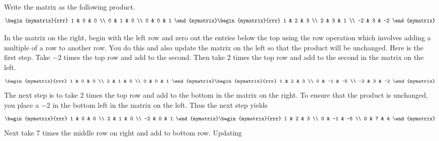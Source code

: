 \begin{solution}

Write the matrix as the following product.
\begin{equation*}
\begin{mymatrix}{rrr}
1 & 0 & 0 \\ 
0 & 1 & 0 \\ 
0 & 0 & 1
\end{mymatrix} \begin{mymatrix}{rrr}
1 & 2 & 3 \\ 
2 & 3 & 1 \\ 
-2 & 3 & -2
\end{mymatrix}
\end{equation*}

In the matrix on the right, begin with the left row and zero
out the entries below the top using the row operation which involves adding
a multiple of a row to another row. You do this and also update the matrix
on the left so that the product will be unchanged. Here is the first step.
Take $-2$ times the top row and add to the second. Then take $2$ times the
top row and add to the second in the matrix on the left. 
\begin{equation*}
\begin{mymatrix}{rrr}
1 & 0 & 0 \\ 
2 & 1 & 0 \\ 
0 & 0 & 1
\end{mymatrix} \begin{mymatrix}{rrr}
1 & 2 & 3 \\ 
0 & -1 & -5 \\ 
-2 & 3 & -2
\end{mymatrix}
\end{equation*}
The next step is to take $2$ times the top row and add to the bottom in the
matrix on the right. To ensure that the product is unchanged, you place a $%
-2 $ in the bottom left in the matrix on the left. Thus the next step yields 
\begin{equation*}
\begin{mymatrix}{rrr}
1 & 0 & 0 \\ 
2 & 1 & 0 \\ 
-2 & 0 & 1
\end{mymatrix} \begin{mymatrix}{rrr}
1 & 2 & 3 \\ 
0 & -1 & -5 \\ 
0 & 7 & 4
\end{mymatrix}
\end{equation*}
Next take $7$ times the middle row on right and add to bottom row. Updating

\end{solution}
